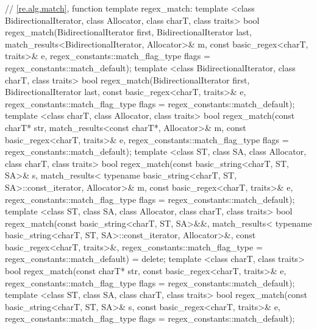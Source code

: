 \begin{codeblock}
{  // \ref{re.alg.match}, function template regex_match:
  template <class BidirectionalIterator, class Allocator,
      class charT, class traits>
    bool regex_match(BidirectionalIterator first, BidirectionalIterator last,
                     match_results<BidirectionalIterator, Allocator>& m,
                     const basic_regex<charT, traits>& e,
                     regex_constants::match_flag_type flags =
                       regex_constants::match_default);
  template <class BidirectionalIterator, class charT, class traits>
  bool regex_match(BidirectionalIterator first, BidirectionalIterator last,
                   const basic_regex<charT, traits>& e,
                   regex_constants::match_flag_type flags =
                     regex_constants::match_default);
  template <class charT, class Allocator, class traits>
    bool regex_match(const charT* str, match_results<const charT*, Allocator>& m,
                     const basic_regex<charT, traits>& e,
                     regex_constants::match_flag_type flags =
                       regex_constants::match_default);
  template <class ST, class SA, class Allocator, class charT, class traits>
    bool regex_match(const basic_string<charT, ST, SA>& s,
                     match_results<
                       typename basic_string<charT, ST, SA>::const_iterator, 
                       Allocator>& m, 
                     const basic_regex<charT, traits>& e, 
                     regex_constants::match_flag_type flags =
                       regex_constants::match_default);
  template <class ST, class SA, class Allocator, class charT, class traits> 
    bool regex_match(const basic_string<charT, ST, SA>&&, 
                     match_results<
                       typename basic_string<charT, ST, SA>::const_iterator, 
                       Allocator>&, 
                     const basic_regex<charT, traits>&, 
                     regex_constants::match_flag_type = 
                       regex_constants::match_default) = delete;
  template <class charT, class traits>
    bool regex_match(const charT* str,
                     const basic_regex<charT, traits>& e,
                     regex_constants::match_flag_type flags =
                       regex_constants::match_default);
  template <class ST, class SA, class charT, class traits>
    bool regex_match(const basic_string<charT, ST, SA>& s,
                     const basic_regex<charT, traits>& e,
                     regex_constants::match_flag_type flags =
                       regex_constants::match_default);

}
\end{codeblock}
